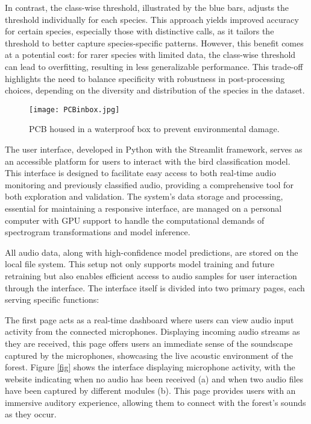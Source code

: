 In contrast, the class-wise threshold, illustrated by the blue bars, adjusts the threshold individually for each species. This approach yields improved accuracy for certain species, especially those with distinctive calls, as it tailors the threshold to better capture species-specific patterns. However, this benefit comes at a potential cost: for rarer species with limited data, the class-wise threshold can lead to overfitting, resulting in less generalizable performance. This trade-off highlights the need to balance specificity with robustness in post-processing choices, depending on the diversity and distribution of the species in the dataset.

\begin{figure}[h]
    \centering
    \texttt{[image: PCBinbox.jpg]}
    \caption{PCB housed in a waterproof box to prevent environmental damage.}
    \vspace{0.1cm}
    \label{fig:pcb_box}
\end{figure}


The user interface, developed in Python with the Streamlit framework, serves as an accessible platform for users to interact with the bird classification model. This interface is designed to facilitate easy access to both real-time audio monitoring and previously classified audio, providing a comprehensive tool for both exploration and validation. The system’s data storage and processing, essential for maintaining a responsive interface, are managed on a personal computer with GPU support to handle the computational demands of spectrogram transformations and model inference.

All audio data, along with high-confidence model predictions, are stored on the local file system. This setup not only supports model training and future retraining but also enables efficient access to audio samples for user interaction through the interface. The interface itself is divided into two primary pages, each serving specific functions:

The first page acts as a real-time dashboard where users can view audio input activity from the connected microphones. Displaying incoming audio streams as they are received, this page offers users an immediate sense of the soundscape captured by the microphones, showcasing the live acoustic environment of the forest. Figure \ref{fig} shows the interface displaying microphone activity, with the website indicating when no audio has been received (a) and when two audio files have been captured by different modules (b). This page provides users with an immersive auditory experience, allowing them to connect with the forest’s sounds as they occur.

